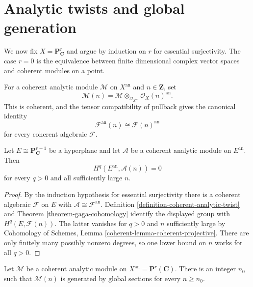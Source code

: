 \section{Analytic twists and global generation}
\label{section-gaga-analytic-twists}

We now fix $X=\mathbf P^r_{\mathbf C}$ and argue by induction on $r$ for
essential surjectivity. The case $r=0$ is the equivalence between finite
dimensional complex vector spaces and coherent modules on a point.

\begin{definition}
\label{definition-coherent-analytic-twist}
For a coherent analytic module $\mathcal M$ on $X^{\mathrm{an}}$ and
$n\in\mathbf Z$, set
$$
\mathcal M(n)=
\mathcal M\otimes_{\mathcal O_{X^{\mathrm{an}}}}
\mathcal O_X(n)^{\mathrm{an}}.
$$
This is coherent, and the tensor compatibility of pullback gives the
canonical identity
$$
\mathcal F^{\mathrm{an}}(n)\cong\mathcal F(n)^{\mathrm{an}}
$$
for every coherent algebraic $\mathcal F$.
\end{definition}

\begin{lemma}
\label{lemma-hyperplane-analytic-serre-vanishing}
Let $E\cong\mathbf P^{r-1}_{\mathbf C}$ be a hyperplane and let $\mathcal A$
be a coherent analytic module on $E^{\mathrm{an}}$. Then
$$
H^q(E^{\mathrm{an}},\mathcal A(n))=0
$$
for every $q>0$ and all sufficiently large $n$.
\end{lemma}

\begin{proof}
By the induction hypothesis for essential surjectivity there is a coherent
algebraic $\mathcal F$ on $E$ with
$\mathcal A\cong\mathcal F^{\mathrm{an}}$. Definition
\ref{definition-coherent-analytic-twist} and Theorem
\ref{theorem-gaga-cohomology} identify the displayed group with
$H^q(E,\mathcal F(n))$. The latter vanishes for $q>0$ and $n$ sufficiently
large by Cohomology of Schemes, Lemma
\ref{coherent-lemma-coherent-projective}. There are only finitely many
possibly nonzero degrees, so one lower bound on $n$ works for all $q>0$.
\end{proof}

\begin{lemma}
\label{lemma-projective-analytic-global-generation}
Let $\mathcal M$ be a coherent analytic module on
$X^{\mathrm{an}}=\mathbf P^r(\mathbf C)$. There is an integer $n_0$ such
that $\mathcal M(n)$ is generated by global sections for every $n\geq n_0$.
\end{lemma}

